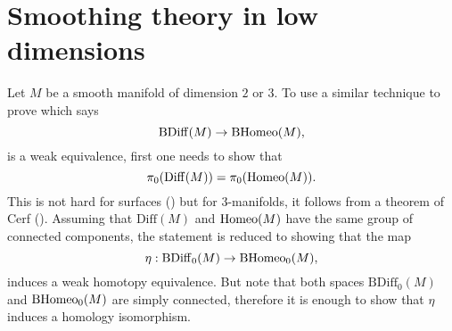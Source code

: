 \documentclass[a4paper]{amsart}
\theoremstyle{definition}
\theoremstyle{remark}
\newcommand\Diff{\mathrm{Diff}}
\newcommand\BDiff{\mathrm{BDiff}}
\newcommand{\tH}{\text{\textnormal{Homeo}}}
\newcommand{\BH}{\mathrm{B}\text{\textnormal{Homeo}}}
\numberwithin{equation}{section}
\begin{document}
\section{Smoothing theory in low dimensions} \label{sec3} Let $M$ be a smooth manifold of  dimension $2$ or $3$. 
To use a similar technique to prove  which says 
\begin{equation}
\BDiff(M)\to \BH(M),
\end{equation}
is a weak equivalence, first one needs to show that \begin{equation}\label{assumption}\pi_0(\Diff(M))=\pi_0(\tH(M)).\end{equation} This is not hard for surfaces (\cite{boldsen2009different}) but for $3$-manifolds, it follows from a  theorem of Cerf (\cite{cerf1961topologie}). Assuming that $\Diff(M)$ and $\tH(M)$ have the same group of connected components, the statement is reduced to showing that the map
\[
\eta: \BDiff_0(M)\to \BH_0(M),
\]
induces a weak homotopy equivalence. But note that both spaces $\BDiff_0(M)$ and $ \BH_0(M)$ are simply connected, therefore it is enough to show that $\eta$ induces a homology isomorphism. 
\end{document}
